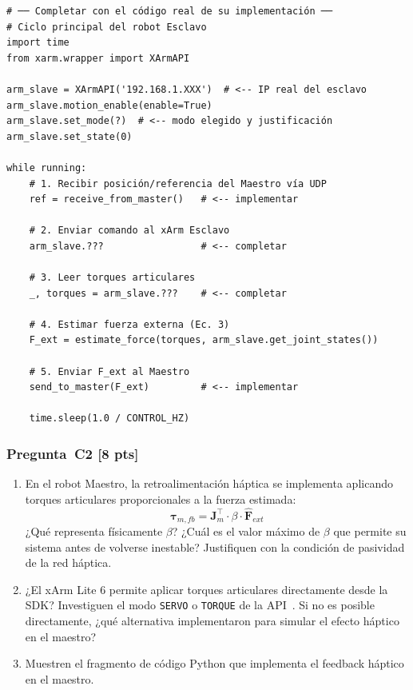 \documentclass[journal,10pt,twoside]{IEEEtran}
\newcommand{\pts}[1]{\textcolor{tec_red}{\textbf{[#1 pts]}}}
\begin{document}
\begin{lstlisting}[caption={Ciclo de control del robot Esclavo — Completar con su implementación real},
                   label={lst:slave}]
# ── Completar con el código real de su implementación ──
# Ciclo principal del robot Esclavo
import time
from xarm.wrapper import XArmAPI

arm_slave = XArmAPI('192.168.1.XXX')  # <-- IP real del esclavo
arm_slave.motion_enable(enable=True)
arm_slave.set_mode(?)  # <-- modo elegido y justificación
arm_slave.set_state(0)

while running:
    # 1. Recibir posición/referencia del Maestro vía UDP
    ref = receive_from_master()   # <-- implementar

    # 2. Enviar comando al xArm Esclavo
    arm_slave.???                 # <-- completar

    # 3. Leer torques articulares
    _, torques = arm_slave.???    # <-- completar

    # 4. Estimar fuerza externa (Ec. 3)
    F_ext = estimate_force(torques, arm_slave.get_joint_states())

    # 5. Enviar F_ext al Maestro
    send_to_master(F_ext)         # <-- implementar

    time.sleep(1.0 / CONTROL_HZ)
\end{lstlisting}

\subsubsection*{Pregunta~C2 \pts{8}}
\begin{enumerate}[label=(\alph*)]
  \item En el robot Maestro, la retroalimentación háptica se implementa
        aplicando torques articulares proporcionales a la fuerza estimada:
        \[
          \bm{\tau}_{m,fb} = \bm{J}_m^\top \cdot \beta \cdot \hat{\bm{F}}_{ext}
        \]
        ¿Qué representa físicamente $\beta$?
        ¿Cuál es el valor máximo de $\beta$ que permite su sistema
        antes de volverse inestable?
        Justifiquen con la condición de pasividad de la red háptica.
  \item ¿El xArm Lite 6 permite aplicar torques articulares directamente
        desde la SDK? Investiguen el modo \texttt{SERVO} o
        \texttt{TORQUE} de la API~\cite{xarm_github}.
        Si no es posible directamente, ¿qué alternativa implementaron
        para simular el efecto háptico en el maestro?
  \item Muestren el fragmento de código Python que implementa el
        feedback háptico en el maestro.
\end{enumerate}
\end{document}
